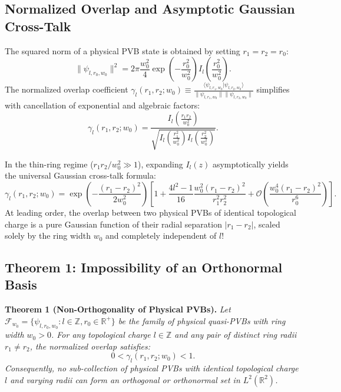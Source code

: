 \documentclass{optica-article}
\begin{document}
\subsection{Normalized Overlap and Asymptotic Gaussian Cross-Talk}

The squared norm of a physical PVB state is obtained by setting $r_1 = r_2 = r_0$:
\begin{equation}
\|\psi_{l, r_0, w_0}\|^2 = 2\pi \frac{w_0^2}{4} \exp\left( - \frac{r_0^2}{w_0^2} \right) I_l\left( \frac{r_0^2}{w_0^2} \right).
\end{equation}
The normalized overlap coefficient $\gamma_l(r_1, r_2; w_0) \equiv \frac{\langle \psi_{l, r_1, w_0} | \psi_{l, r_2, w_0} \rangle}{\|\psi_{l, r_1, w_0}\| \|\psi_{l, r_2, w_0}\|}$ simplifies with cancellation of exponential and algebraic factors:
\begin{equation}
\boxed{\gamma_l(r_1, r_2; w_0) = \frac{I_l\left( \frac{r_1 r_2}{w_0^2} \right)}{\sqrt{I_l\left( \frac{r_1^2}{w_0^2} \right) I_l\left( \frac{r_2^2}{w_0^2} \right)}}.}
\label{eq:normalized_overlap}
\end{equation}

In the thin-ring regime ($r_1 r_2 / w_0^2 \gg 1$), expanding $I_l(z)$ asymptotically yields the universal Gaussian cross-talk formula:
\begin{equation}
\boxed{\gamma_l(r_1, r_2; w_0) = \exp\left( - \frac{(r_1 - r_2)^2}{2 w_0^2} \right) \left[ 1 + \frac{4l^2 - 1}{16} \frac{w_0^2 (r_1 - r_2)^2}{r_1^2 r_2^2} + \mathcal{O}\left( \frac{w_0^4 (r_1 - r_2)^2}{r_0^6} \right) \right].}
\label{eq:asymptotic_overlap}
\end{equation}
At leading order, the overlap between two physical PVBs of identical topological charge is a pure Gaussian function of their radial separation $|r_1 - r_2|$, scaled solely by the ring width $w_0$ and completely independent of $l$!

\subsection{Theorem 1: Impossibility of an Orthonormal Basis}

\noindent\textbf{Theorem 1 (Non-Orthogonality of Physical PVBs).}  
\emph{Let $\mathcal{F}_{w_0} = \{\psi_{l, r_0, w_0} : l \in \mathbb{Z}, r_0 \in \mathbb{R}^+\}$ be the family of physical quasi-PVBs with ring width $w_0 > 0$. For any topological charge $l \in \mathbb{Z}$ and any pair of distinct ring radii $r_1 \neq r_2$, the normalized overlap satisfies:}
\begin{equation}
0 < \gamma_l(r_1, r_2; w_0) < 1.
\end{equation}
\emph{Consequently, no sub-collection of physical PVBs with identical topological charge $l$ and varying radii can form an orthogonal or orthonormal set in $L^2(\mathbb{R}^2)$.}
\end{document}
